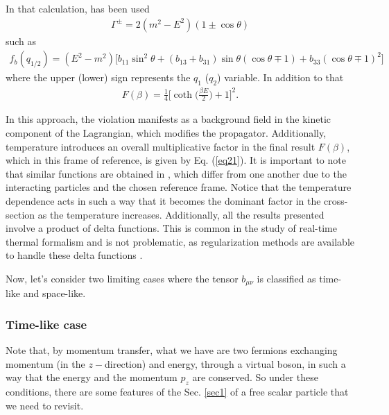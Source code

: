 \documentclass[11pt,showpacs,preprintnumbers,amsmath,amssymb,prd,nofootinbib,superscriptaddress]{revtex4-2}
\begin{document}
{{\color{red} In that calculation, has been used
\begin{eqnarray}
\Gamma^{\pm}=2(m^2-E^2)(1\pm\cos{\theta})
\end{eqnarray}
such as}
\begin{eqnarray}f_b(q_{1/2})=(E^2-m^2)\biggl[b_{11}\sin^2{\theta}+(b_{13}+b_{31})\sin{\theta}(\cos{\theta}\mp1)+b_{33}(\cos{\theta}\mp1)^2\biggr]\end{eqnarray}
where the upper (lower) sign represents the $q_1$ ($q_2$) variable. In addition to that
\begin{eqnarray}F(\beta)=\frac{1}{4}\biggl[\coth{\biggl(\frac{\beta E}{2}\biggr)}+1\biggr]^2.\label{eq21}
\end{eqnarray}

In this approach, the violation manifests as a background field in the kinetic component of the Lagrangian, which modifies the propagator. Additionally, temperature introduces an overall multiplicative factor in the final result $F(\beta)$, which in this frame of reference, is given by Eq. (\ref{eq21}). It is important to note that similar functions are obtained in \cite{scatter2, cabral2023violation, scatter3}, which differ from one another due to the interacting particles and the chosen reference frame.
Notice that the temperature dependence acts in such a way that it becomes the dominant factor in the cross-section as the temperature increases. Additionally, all the results presented involve a product of delta functions. This is common in the study of real-time thermal formalism and is not problematic, as regularization methods are available to handle these delta functions \cite{regdelta}.}

Now, let's consider two limiting cases where the tensor $b_{\mu \nu}$ is classified as time-like and space-like.

\subsubsection{Time-like case}

Note that, by momentum transfer, what we have are two fermions exchanging momentum (in the $z-$direction) and energy, through a virtual boson, in such a way that the energy and the momentum $p_z$ are conserved. So under these conditions, there are some features of the Sec. \ref{sec1} of a free scalar particle that we need to revisit.
\end{document}
